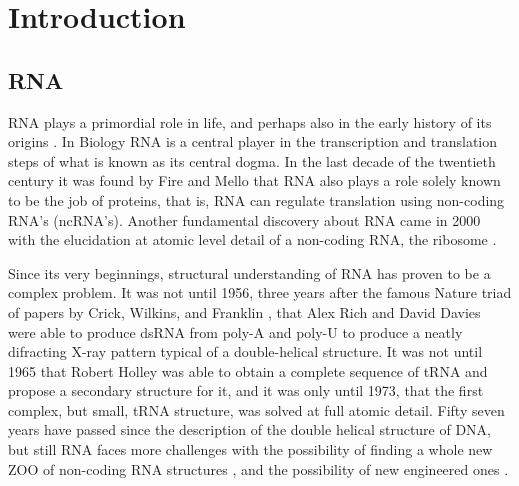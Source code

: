 \chapter{Introduction}
\label{introduction} 

\section{RNA}
RNA plays  a primordial role  in life, and  perhaps also in  the early
history of its  origins \cite{orgel2004}. In Biology RNA  is a central
player in the transcription and  translation steps of what is known as
its central dogma.
In
the last  decade of  the twentieth  century it was  found by  Fire and
Mello \cite{} that RNA also plays a role solely known to be the job of
proteins, that is, RNA can regulate translation using non-coding RNA's
(ncRNA's). Another  fundamental discovery about RNA came  in 2000 with
the elucidation  at atomic level detail  of a  non-coding RNA, the
ribosome \cite{schluenzen2000, ban2000, wimberly2000}.

Since its very beginnings,  structural understanding of RNA has proven
to be a complex problem. It  was not until 1956, three years after the
famous  Nature  triad  of  papers  by  Crick,  Wilkins,  and  Franklin
\cite{watson1953a},  that Alex  Rich  and David  Davies  were able  to
produce dsRNA from  poly-A and poly-U to produce  a neatly difracting
X-ray pattern typical of a  double-helical structure. It was not until
1965 that Robert  Holley was able to obtain  a complete sequence of
tRNA and propose  a secondary structure for it, and  it was only until
1973, that the first complex,  but small, tRNA structure, was solved at
full  atomic   detail.  Fifty  seven  years  have   passed  since  the
description  of the  double helical  structure of  DNA, but  still RNA
faces more challenges with the  possibility of finding a whole new ZOO
of non-coding RNA  structures \cite{weinberg2009}, and the possibility
of new engineered ones \cite{severcan2009}.

